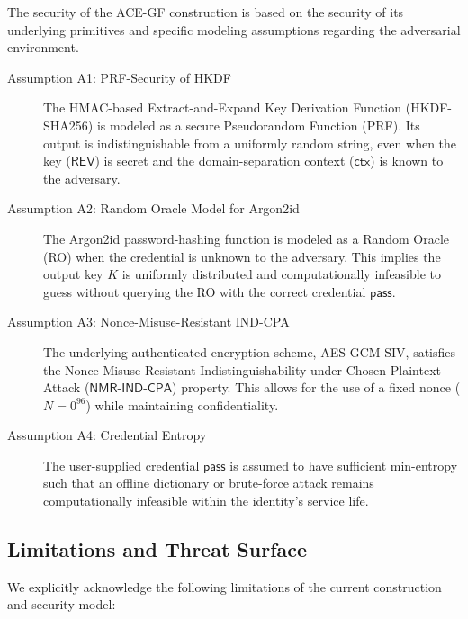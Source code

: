 \documentclass[12pt,a4paper]{article}
\begin{document}
  The security of the ACE-GF construction is based on the security of its underlying primitives and specific modeling assumptions regarding the adversarial environment.

  \begin{description}
   \item[Assumption A1: PRF-Security of HKDF]
   The HMAC-based Extract-and-Expand Key Derivation Function (HKDF-SHA256) is modeled as a secure Pseudorandom Function (PRF). Its output is indistinguishable from a uniformly random string, even when the key ($\mathsf{REV}$) is secret and the domain-separation context ($\mathsf{ctx}$) is known to the adversary.
   \item[Assumption A2: Random Oracle Model for Argon2id]
   The Argon2id password-hashing function is modeled as a Random Oracle (RO) when the credential is unknown to the adversary. This implies the output key $K$ is uniformly distributed and computationally infeasible to guess without querying the RO with the correct credential $\mathsf{pass}$.
   \item[Assumption A3: Nonce-Misuse-Resistant IND-CPA]
   The underlying authenticated encryption scheme, AES-GCM-SIV, satisfies the Nonce-Misuse Resistant Indistinguishability under Chosen-Plaintext Attack ($\mathsf{NMR}$-$\mathsf{IND}$-$\mathsf{CPA}$) property. This allows for the use of a fixed nonce ($N=0^{96}$) while maintaining confidentiality.
   \item[Assumption A4: Credential Entropy]
   The user-supplied credential $\mathsf{pass}$ is assumed to have sufficient min-entropy such that an offline dictionary or brute-force attack remains computationally infeasible within the identity's service life.
  \end{description}

  \subsection{Limitations and Threat Surface}

  We explicitly acknowledge the following limitations of the current construction and security model:
\end{document}
